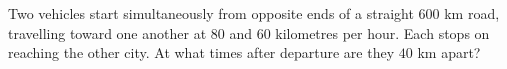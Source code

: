 Two vehicles start simultaneously from opposite ends of a straight $600$ km road, travelling toward one another at $80$ and $60$ kilometres per hour. Each stops on reaching the other city. At what times after departure are they $40$ km apart?
